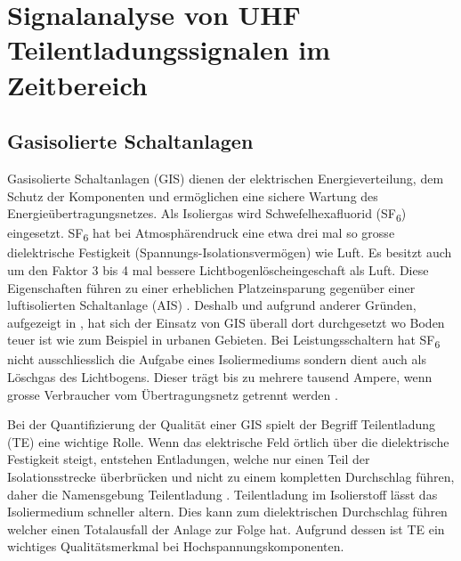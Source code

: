 %
%
%
\chapter{Signalanalyse von UHF Teilentladungssignalen im Zeitbereich \label{chapter:gis}}
\begin{refsection}

\section{Gasisolierte Schaltanlagen}

Gasisolierte Schaltanlagen (GIS) dienen der elektrischen Energieverteilung, dem Schutz der Komponenten und ermöglichen eine sichere Wartung des Energieübertragungsnetzes.
Als Isoliergas wird Schwefelhexafluorid (SF\textsubscript{6}) eingesetzt. SF\textsubscript{6} hat bei Atmosphärendruck eine etwa drei mal so grosse dielektrische Festigkeit (Spannungs-Isolationsvermögen) wie Luft. 
Es besitzt auch um den Faktor 3 bis 4 mal bessere Lichtbogenlöscheingeschaft als Luft. 
Diese Eigenschaften führen zu einer erheblichen Platzeinsparung gegenüber einer luftisolierten Schaltanlage (AIS) \cite{buch:ABB}.
Deshalb und aufgrund anderer Gründen, aufgezeigt in \cite{buch:GIS/AIS}, hat sich der Einsatz von GIS überall dort durchgesetzt wo Boden teuer ist wie zum Beispiel in urbanen Gebieten. 
Bei Leistungsschaltern hat SF\textsubscript{6} nicht ausschliesslich die Aufgabe eines Isoliermediums sondern dient auch als Löschgas des Lichtbogens.
Dieser trägt bis zu mehrere tausend Ampere, wenn grosse Verbraucher vom Übertragungsnetz getrennt werden \cite{buch:ABB}. 

Bei der Quantifizierung der Qualität einer GIS spielt der Begriff Teilentladung (TE) eine wichtige Rolle. 
Wenn das elektrische Feld örtlich über die dielektrische Festigkeit steigt, entstehen Entladungen, welche nur einen Teil der Isolationsstrecke überbrücken und nicht zu einem kompletten Durchschlag führen, daher die Namensgebung Teilentladung \cite{buch:Kuchler}.
Teilentladung im Isolierstoff lässt das Isoliermedium  schneller altern. Dies kann zum dielektrischen Durchschlag führen welcher einen Totalausfall der Anlage zur Folge hat.
Aufgrund dessen ist TE ein wichtiges Qualitätsmerkmal bei Hochspannungskomponenten. 


\end{refsection}
